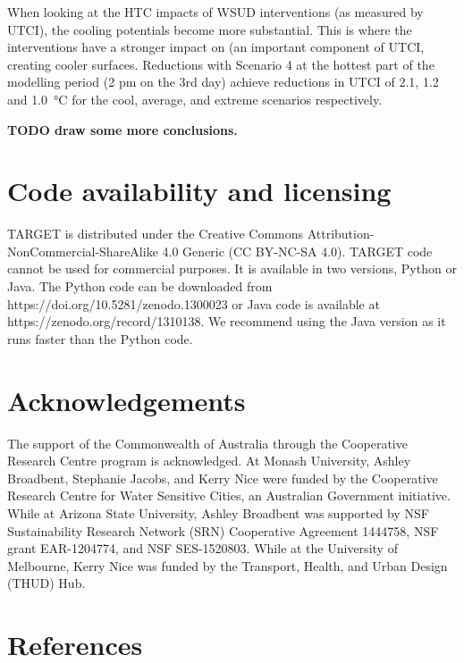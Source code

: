 \documentclass[final,3p,times,authoryear]{elsarticle}
\begin{document}
When looking at the HTC impacts of WSUD interventions (as measured by UTCI), the cooling potentials become more substantial. This is where the interventions have a stronger impact on  (an important component of UTCI, creating cooler surfaces. Reductions with Scenario 4 at the hottest part of the modelling period (2 pm on the 3rd day) achieve reductions in UTCI of 2.1, 1.2 and 1.0\SI{}{\degreeCelsius} for the cool, average, and extreme scenarios respectively. 

\textbf{TODO draw some more conclusions.}

\section{Code availability and licensing}\label{sec:available}

TARGET is distributed under the Creative Commons Attribution-NonCommercial-ShareAlike 4.0 Generic (CC BY-NC-SA 4.0). TARGET code cannot be used for commercial purposes. It is available in two versions, Python or Java. The Python code can be downloaded from https://doi.org/10.5281/zenodo.1300023 or Java code is available at  https://zenodo.org/record/1310138. We recommend using the Java version as it runs faster than the Python code. 



\printglossary[title={List of Symbols}]

\section*{Acknowledgements}
The support of the Commonwealth of Australia through the Cooperative Research Centre program is acknowledged. At Monash University, Ashley Broadbent, Stephanie Jacobs, and Kerry Nice were funded by the Cooperative Research Centre for Water Sensitive Cities, an Australian Government initiative. While at Arizona State University, Ashley Broadbent was supported by NSF Sustainability Research Network (SRN) Cooperative Agreement 1444758, NSF grant EAR-1204774, and NSF SES-1520803. While at the University of Melbourne, Kerry Nice was funded by the Transport, Health, and Urban Design (THUD) Hub. 
 

\section*{References}\label{sec:ref}
   
  
\end{document}
